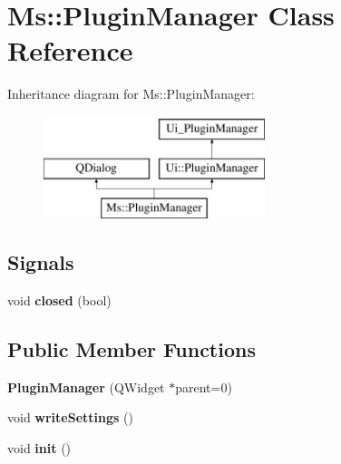 \hypertarget{class_ms_1_1_plugin_manager}{}\section{Ms\+:\+:Plugin\+Manager Class Reference}
\label{class_ms_1_1_plugin_manager}
Inheritance diagram for Ms\+:\+:Plugin\+Manager\+:\begin{figure}[H]
\begin{center}
\leavevmode
\includegraphics[height=3.000000cm]{class_ms_1_1_plugin_manager}
\end{center}
\end{figure}
\subsection*{Signals}
\begin{DoxyCompactItemize}
\item 
\mbox{\label{class_ms_1_1_plugin_manager_ac6a5e8697011bda54b30cb7d1293ebfc}} 
void {\bfseries closed} (bool)
\end{DoxyCompactItemize}
\subsection*{Public Member Functions}
\begin{DoxyCompactItemize}
\item 
\mbox{\label{class_ms_1_1_plugin_manager_a26355a667fa4cd736d0b67ab1a0f3340}} 
{\bfseries Plugin\+Manager} (Q\+Widget $\ast$parent=0)
\item 
\mbox{\label{class_ms_1_1_plugin_manager_a8051a680b20ed6f2b3ca9fd514bdd003}} 
void {\bfseries write\+Settings} ()
\item 
\mbox{\label{class_ms_1_1_plugin_manager_aa62663d85dc934696fe8cf17a4ad2566}} 
void {\bfseries init} ()
\end{DoxyCompactItemize}
